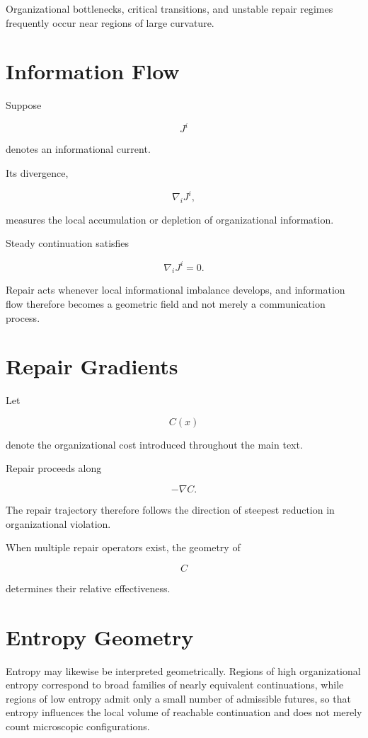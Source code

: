 \documentclass[11pt,oneside]{book}
\numberwithin{equation}{chapter}
\theoremstyle{definition}
\theoremstyle{plain}
\begin{document}
Organizational bottlenecks, critical transitions, and unstable repair regimes frequently occur near regions of large curvature.

\section{Information Flow}

Suppose

\[
J^i
\]

denotes an informational current.

Its divergence,

\[
\nabla_iJ^i,
\]

measures the local accumulation or depletion of organizational
information.

Steady continuation satisfies

\[
\nabla_iJ^i
=
0.
\]

Repair acts whenever local informational imbalance develops, and information flow therefore becomes a geometric field and not merely a communication process.

\section{Repair Gradients}

Let

\[
C(x)
\]

denote the organizational cost introduced throughout the main text.

Repair proceeds along

\[
-\nabla C.
\]

The repair trajectory therefore follows the direction of steepest
reduction in organizational violation.

When multiple repair operators exist, the geometry of

\[
C
\]

determines their relative effectiveness.

\section{Entropy Geometry}

Entropy may likewise be interpreted geometrically. Regions of high organizational entropy correspond to broad families of nearly equivalent continuations, while regions of low entropy admit only a small number of admissible futures, so that entropy influences the local volume of reachable continuation and does not merely count microscopic configurations.
\end{document}

